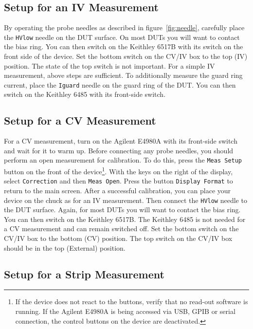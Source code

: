 \documentclass[a4paper]{article}
\begin{document}
\subsection{Setup for an IV Measurement}
\label{sec:ivsetup}

By operating the probe needles as described in figure~\ref{fig:needle}, carefully place the {\tt HVlow} needle on the DUT surface.
On most DUTs you will want to contact the bias ring.
You can then switch on the Keithley 6517B with its switch on the front side of the device.
Set the bottom switch on the CV/IV box to the top (IV) position.
The state of the top switch is not important.
For a simple IV measurement, above steps are sufficient.
To additionally measure the guard ring current, place the {\tt Iguard} needle on the guard ring of the DUT.
You can then switch on the Keithley 6485 with its front-side switch.\\

\subsection{Setup for a CV Measurement}
\label{sec:cvsetup}

For a CV measurement, turn on the Agilent E4980A with its front-side switch and wait for it to warm up.
Before connecting any probe needles, you should perform an open measurement for calibration.
To do this, press the {\tt Meas Setup} button on the front of the device\footnote{If the device does not react to the buttons, verify that no read-out software is running. If the Agilent E4980A is being accessed via USB, GPIB or serial connection, the control buttons on the device are deactivated.}.
With the keys on the right of the display, select {\tt Correction} and then {\tt Meas Open}.
Press the button {\tt Display Format} to return to the main screen.
After a successful calibration, you can place your device on the chuck as for an IV measurement.
Then connect the {\tt HVlow} needle to the DUT surface.
Again, for most DUTs you will want to contact the bias ring.
You can then switch on the Keithley 6517B.
The Keithley 6485 is not needed for a CV measurement and can remain switched off.
Set the bottom switch on the CV/IV box to the bottom (CV) position.
The top switch on the CV/IV box should be in the top (External) position.\\

\subsection{Setup for a Strip Measurement}
\label{sec:stripsetup}
\end{document}
